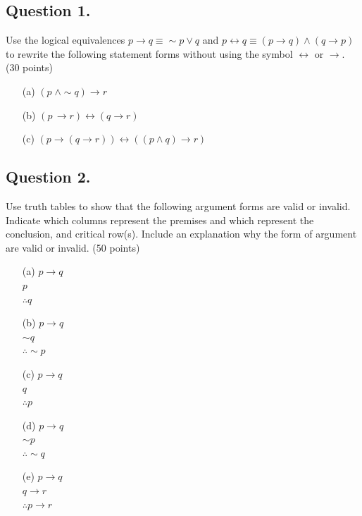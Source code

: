 \documentclass[12pt]{article}
\begin{document}
\subsection*{Question 1.}
Use the logical equivalences \( p \rightarrow q \equiv \sim p \lor q \) and \( p \leftrightarrow q \equiv (p \rightarrow q) \land (q \rightarrow p) \) to rewrite the following statement forms without using the symbol \(\leftrightarrow\) or \(\rightarrow\). (30 points)
\begin{enumerate}
	\item[(a)] \((p\; \land \sim q) \rightarrow r\)
	      
	      \vspace{10cm}
	\item[(b)] \((p\, \rightarrow r) \leftrightarrow (q \rightarrow r)\)
	      
	      \vspace{10cm}
	\item[(c)] \((p \rightarrow (q \rightarrow r)) \leftrightarrow ((p \land q) \rightarrow r)\)
	      
	      \vspace{10cm}
\end{enumerate}

\newpage
\subsection*{Question 2. }
Use truth tables to show that the following argument forms are valid or invalid. Indicate which columns represent the premises and which represent the conclusion, and critical row(s). Include an explanation why the form of argument are valid or invalid. (50 points)
\begin{enumerate}
	\item[(a)] \( p \rightarrow q \)\\
	      \( p \)\\
	      \(\therefore q\)
	      \vspace{6cm}
	\item[(b)] \( p \rightarrow q \)\\
	      \( \sim q \)\\
	      \(\therefore \sim p\)
	      \vspace{6cm}
	\item[(c)] \( p \rightarrow q \)\\
	      \( q \)\\
	      \(\therefore p\)
	      \vspace{6cm}
	\item[(d)] \( p \rightarrow q \)\\
	      \( \sim p \)\\
	      \(\therefore \sim q\)
	      \vspace{6cm}
	\item[(e)] \( p \rightarrow q \)\\
	      \( q \rightarrow r \)\\
	      \(\therefore p \rightarrow r\)
	      \vspace{8cm}
\end{enumerate}
\newpage
\end{document}
